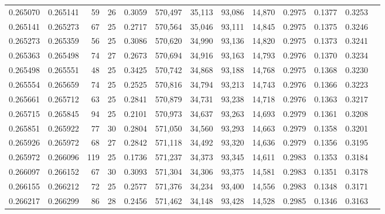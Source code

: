 \begin{tabular}{rrrrrrrrrrrrr}
0.265070 & 0.265141 &  59 &  26 &                                     0.3059 & 570,497 &  35,113 &  93,086 &  14,870 & 0.2975 & 0.1377 & 0.3253 \\
0.265141 & 0.265273 &  67 &  25 &                                     0.2717 & 570,564 &  35,046 &  93,111 &  14,845 & 0.2975 & 0.1375 & 0.3246 \\
0.265273 & 0.265359 &  56 &  25 &                                     0.3086 & 570,620 &  34,990 &  93,136 &  14,820 & 0.2975 & 0.1373 & 0.3241 \\
0.265363 & 0.265498 &  74 &  27 &                                     0.2673 & 570,694 &  34,916 &  93,163 &  14,793 & 0.2976 & 0.1370 & 0.3234 \\
0.265498 & 0.265551 &  48 &  25 &                                     0.3425 & 570,742 &  34,868 &  93,188 &  14,768 & 0.2975 & 0.1368 & 0.3230 \\
0.265554 & 0.265659 &  74 &  25 &                                     0.2525 & 570,816 &  34,794 &  93,213 &  14,743 & 0.2976 & 0.1366 & 0.3223 \\
0.265661 & 0.265712 &  63 &  25 &                                     0.2841 & 570,879 &  34,731 &  93,238 &  14,718 & 0.2976 & 0.1363 & 0.3217 \\
0.265715 & 0.265845 &  94 &  25 &                                     0.2101 & 570,973 &  34,637 &  93,263 &  14,693 & 0.2979 & 0.1361 & 0.3208 \\
0.265851 & 0.265922 &  77 &  30 &                                     0.2804 & 571,050 &  34,560 &  93,293 &  14,663 & 0.2979 & 0.1358 & 0.3201 \\
0.265926 & 0.265972 &  68 &  27 &                                     0.2842 & 571,118 &  34,492 &  93,320 &  14,636 & 0.2979 & 0.1356 & 0.3195 \\
0.265972 & 0.266096 & 119 &  25 &                                     0.1736 & 571,237 &  34,373 &  93,345 &  14,611 & 0.2983 & 0.1353 & 0.3184 \\
0.266097 & 0.266152 &  67 &  30 &                                     0.3093 & 571,304 &  34,306 &  93,375 &  14,581 & 0.2983 & 0.1351 & 0.3178 \\
0.266155 & 0.266212 &  72 &  25 &                                     0.2577 & 571,376 &  34,234 &  93,400 &  14,556 & 0.2983 & 0.1348 & 0.3171 \\
0.266217 & 0.266299 &  86 &  28 &                                     0.2456 & 571,462 &  34,148 &  93,428 &  14,528 & 0.2985 & 0.1346 & 0.3163 \\

\end{tabular}
